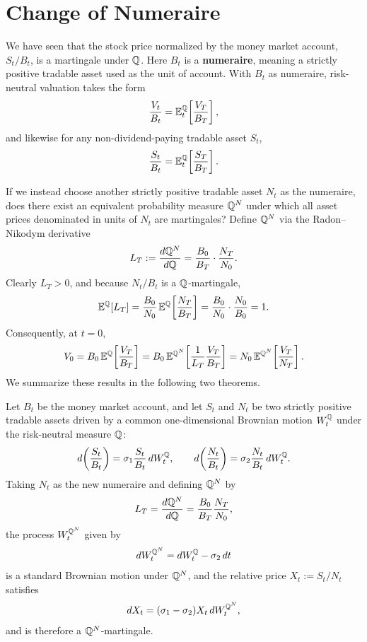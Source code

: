 \section{Change of Numeraire}
\label{sec:ch04-numeraire}

We have seen that the stock price normalized by the money market account, $S_t / B_t$, is a martingale under $\mathbb{Q}$. Here $B_t$ is a \textbf{numeraire}, meaning a strictly positive tradable asset used as the unit of account. With $B_t$ as numeraire, risk-neutral valuation takes the form
\[
    \frac{V_t}{B_t} = \mathbb{E}_t^{\mathbb{Q}}\!\left[\frac{V_T}{B_T}\right],
\]
and likewise for any non-dividend-paying tradable asset $S_t$,
\[
    \frac{S_t}{B_t} = \mathbb{E}_t^{\mathbb{Q}}\!\left[\frac{S_T}{B_T}\right].
\]

If we instead choose another strictly positive tradable asset $N_t$ as the numeraire, does there exist an equivalent probability measure $\mathbb{Q}^N$ under which all asset prices denominated in units of $N_t$ are martingales? Define $\mathbb{Q}^N$ via the Radon--Nikodym derivative
\[
    L_T := \frac{d\mathbb{Q}^N}{d\mathbb{Q}} = \frac{B_0}{B_T}\cdot\frac{N_T}{N_0}.
\]
Clearly $L_T > 0$, and because $N_t / B_t$ is a $\mathbb{Q}$-martingale,
\[
    \mathbb{E}^{\mathbb{Q}}[L_T]
    = \frac{B_0}{N_0}\,\mathbb{E}^{\mathbb{Q}}\!\left[\frac{N_T}{B_T}\right]
    = \frac{B_0}{N_0}\cdot\frac{N_0}{B_0} = 1.
\]
Consequently, at $t = 0$,
\[
    V_0 = B_0\,\mathbb{E}^{\mathbb{Q}}\!\left[\frac{V_T}{B_T}\right]
    = B_0\,\mathbb{E}^{\mathbb{Q}^N}\!\left[\frac{1}{L_T}\frac{V_T}{B_T}\right]
    = N_0\,\mathbb{E}^{\mathbb{Q}^N}\!\left[\frac{V_T}{N_T}\right].
\]
We summarize these results in the following two theorems.

\begin{theorem}
    \label{thm:ch04-numeraire-1}
    Let $B_t$ be the money market account, and let $S_t$ and $N_t$ be two strictly positive tradable assets driven by a common one-dimensional Brownian motion $W_t^{\mathbb{Q}}$ under the risk-neutral measure $\mathbb{Q}$:
    \[
        d\!\left(\frac{S_t}{B_t}\right) = \sigma_1 \frac{S_t}{B_t}\,dW_t^{\mathbb{Q}}, \qquad
        d\!\left(\frac{N_t}{B_t}\right) = \sigma_2 \frac{N_t}{B_t}\,dW_t^{\mathbb{Q}}.
    \]
    Taking $N_t$ as the new numeraire and defining $\mathbb{Q}^N$ by
    \[
        L_T = \frac{d\mathbb{Q}^N}{d\mathbb{Q}} = \frac{B_0}{B_T}\frac{N_T}{N_0},
    \]
    the process $W_t^{\mathbb{Q}^N}$ given by
    \[
        dW_t^{\mathbb{Q}^N} = dW_t^{\mathbb{Q}} - \sigma_2\,dt
    \]
    is a standard Brownian motion under $\mathbb{Q}^N$, and the relative price $X_t := S_t / N_t$ satisfies
    \[
        dX_t = (\sigma_1 - \sigma_2) X_t\,dW_t^{\mathbb{Q}^N},
    \]
    and is therefore a $\mathbb{Q}^N$-martingale.
\end{theorem}

